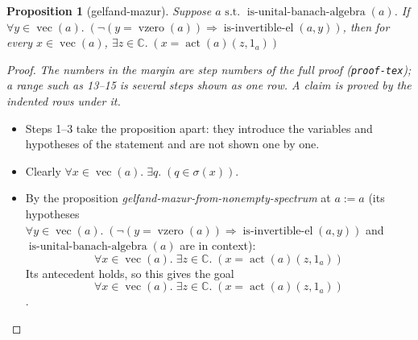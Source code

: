 \documentclass[11pt]{article}
\theoremstyle{plain}
\newtheorem*{proposition*}{Proposition}
\begin{document}
\begin{proposition*}[gelfand-mazur]
Suppose $a \text{ s.t. } \operatorname{is\text{-}unital\text{-}banach\text{-}algebra}(a)$. If $\forall y \in \operatorname{vec}(a).\; (\neg (y = \operatorname{vzero}(a)) \Rightarrow \operatorname{is\text{-}invertible\text{-}el}(a, y))$, then for every $x \in \operatorname{vec}(a)$,  $\exists z \in \mathbb{C}.\; (x = \operatorname{act}(a)(z, 1_{a}))$
\end{proposition*}

\begin{proof}
{\small\emph{The numbers in the margin are step numbers of the full proof (\texttt{proof-tex}); a range such as 13--15 is several steps shown as one row.  A claim is proved by the indented rows under it.}}\par\smallskip
\begin{itemize}[leftmargin=2.8em, itemsep=4pt, parsep=1pt]
  \item[\textbf{1--3}] Steps 1--3 take the proposition apart: they introduce the variables and hypotheses of the statement and are not shown one by one.
  \item[\textbf{4}] Clearly $\forall x \in \operatorname{vec}(a).\; \exists q.\; (q \in \sigma({x}))$.
  \item[\textbf{5--6}] By the proposition \emph{gelfand-mazur-from-nonempty-spectrum} at $a := a$ (its hypotheses $\forall y \in \operatorname{vec}(a).\; (\neg (y = \operatorname{vzero}(a)) \Rightarrow \operatorname{is\text{-}invertible\text{-}el}(a, y))$ and $\operatorname{is\text{-}unital\text{-}banach\text{-}algebra}(a)$ are in context):
\begin{equation*}
\forall x \in \operatorname{vec}(a).\; \exists z \in \mathbb{C}.\; (x = \operatorname{act}(a)(z, 1_{a}))
\end{equation*}
  Its antecedent holds, so this gives the goal
\begin{equation*}
\forall x \in \operatorname{vec}(a).\; \exists z \in \mathbb{C}.\; (x = \operatorname{act}(a)(z, 1_{a}))
\end{equation*}
.
\end{itemize}
\end{proof}
\end{document}

